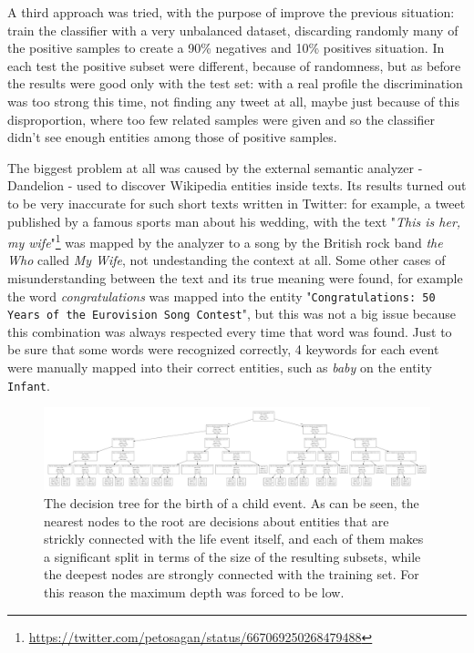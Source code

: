A third approach was tried, with the purpose of improve the previous situation: train the classifier with a very unbalanced dataset, discarding randomly many of the positive samples to create a 90\% negatives and 10\% positives situation. In each test the positive subset were different, because of randomness, but as before the results were good only with the test set: with a real profile the discrimination was too strong this time, not finding any tweet at all, maybe just because of this disproportion, where too few related samples were given and so the classifier didn't see enough entities among those of positive samples.

The biggest problem at all was caused by the external semantic analyzer - Dandelion - used to discover Wikipedia entities inside texts. Its results turned out to be very inaccurate for such short texts written in Twitter: for example, a tweet published by a famous sports man about his wedding, with the text "\textit{This is her, my wife}"\footnote{\url{https://twitter.com/petosagan/status/667069250268479488}} was mapped by the analyzer to a song by the British rock band \textit{the Who} called \textit{My Wife}, not undestanding the context at all. Some other cases of misunderstanding between the text and its true meaning were found, for example the word \textit{congratulations} was mapped into the entity "\texttt{Congratulations: 50 Years of the Eurovision Song Contest}", but this was not a big issue because this combination was always respected every time that word was found. Just to be sure that some words were recognized correctly, 4 keywords for each event were manually mapped into their correct entities, such as \textit{baby} on the entity \texttt{Infant}.

\begin{figure}
\centering
\includegraphics[width=%
1\textwidth]{img/decisiontree}
\caption{The decision tree for the birth of a child event. As can be seen, the nearest nodes to the root are decisions about entities that are strickly connected with the life event itself, and each of them makes a significant split in terms of the size of the resulting subsets, while the deepest nodes are strongly connected with the training set. For this reason the maximum depth was forced to be low.}
\label{fig:decisiontree}
\end{figure}

